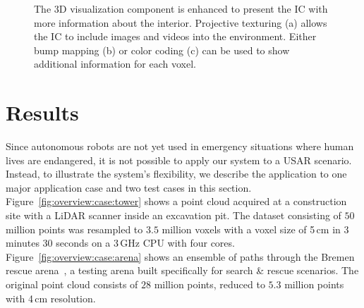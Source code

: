 \documentclass{egpubl}
\begin{document}
\begin{figure}
{		
		\label{fig:imageenhancement:colors}
	}
	\caption{The 3D visualization component is enhanced to present the IC with more information about the interior. Projective texturing (a) allows the IC to include images and videos into the environment. Either bump mapping (b) or color coding (c) can be used to show additional information for each voxel.}
	\label{fig:imageenhancement}
\end{figure}


\section{Results} \label{sec:results}
Since autonomous robots are not yet used in emergency situations where human lives are endangered, it is not possible to apply our system to a USAR scenario. Instead, to illustrate the system's flexibility, we describe the application to one major application case and two test cases in this section.\\
%
 Figure~\ref{fig:overview:case:tower} shows a point cloud acquired at a construction site with a LiDAR scanner inside an excavation pit. The dataset consisting of $50$ million points was resampled to $3.5$ million voxels with a voxel size of 5\,cm in 3 minutes 30 seconds on a 3\,GHz CPU with four cores.\\
%
 Figure~\ref{fig:overview:case:arena} shows an ensemble of paths through the Bremen rescue arena~\cite{varsadan08}, a testing arena built specifically for search \& rescue scenarios. The original point cloud consists of $28$ million points, reduced to $5.3$ million points with 4\,cm resolution.
\end{document}
